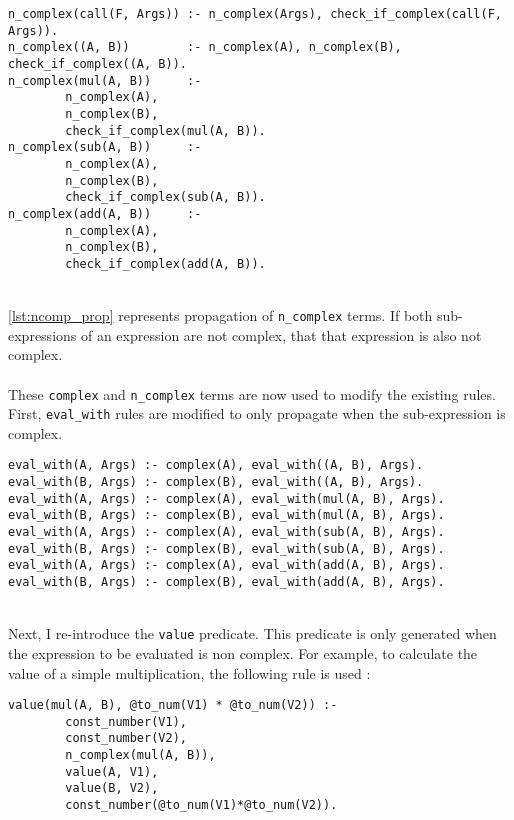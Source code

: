 \begin{lstlisting}[caption={Non complex propagation}, label={lst:ncomp_prop}, firstnumber=174]
n_complex(call(F, Args)) :- n_complex(Args), check_if_complex(call(F, Args)).
n_complex((A, B))        :- n_complex(A), n_complex(B), check_if_complex((A, B)).
n_complex(mul(A, B))     :- 
		n_complex(A), 
		n_complex(B), 
		check_if_complex(mul(A, B)).
n_complex(sub(A, B))     :- 
		n_complex(A), 
		n_complex(B), 
		check_if_complex(sub(A, B)).
n_complex(add(A, B))     :- 
		n_complex(A), 
		n_complex(B), 
		check_if_complex(add(A, B)).
\end{lstlisting}
\mbox{} \\
\ref{lst:ncomp_prop} represents propagation of \lstinline!n_complex! terms. If both sub-expressions of an expression are not complex, that that expression is also not complex. \\ \\
These \lstinline!complex! and \lstinline!n_complex! terms are now used to modify the existing rules. First, \lstinline!eval_with! rules are modified to only propagate when the sub-expression is complex. \\

\begin{lstlisting}[caption={Eval with modification}, label={lst:eval_mod}, firstnumber=139]
eval_with(A, Args) :- complex(A), eval_with((A, B), Args).
eval_with(B, Args) :- complex(B), eval_with((A, B), Args).
eval_with(A, Args) :- complex(A), eval_with(mul(A, B), Args).
eval_with(B, Args) :- complex(B), eval_with(mul(A, B), Args).
eval_with(A, Args) :- complex(A), eval_with(sub(A, B), Args).
eval_with(B, Args) :- complex(B), eval_with(sub(A, B), Args).
eval_with(A, Args) :- complex(A), eval_with(add(A, B), Args).
eval_with(B, Args) :- complex(B), eval_with(add(A, B), Args).
\end{lstlisting}
\mbox{}\\
Next, I re-introduce the \lstinline!value! predicate. This predicate is only generated when the expression to be evaluated is non complex. For example, to calculate the value of a simple multiplication, the following rule is used : 

\begin{lstlisting}[caption={Value with modification}, label={lst:value_mod}, firstnumber=100]
value(mul(A, B), @to_num(V1) * @to_num(V2)) :- 
		const_number(V1), 
		const_number(V2), 
		n_complex(mul(A, B)), 
		value(A, V1), 
		value(B, V2), 
		const_number(@to_num(V1)*@to_num(V2)).
\end{lstlisting}
\pagebreak

